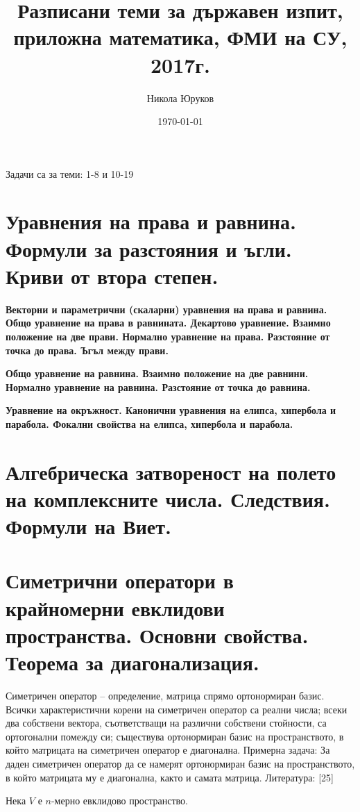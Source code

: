 \documentclass[11pt]{article}
\title{Разписани теми за държавен изпит, приложна математика, ФМИ на СУ, 2017г.}
\author{Никола Юруков}
\date{\today}
\numberwithin{equation}{section}
\numberwithin{figure}{section}
\numberwithin{table}{section}
\theoremstyle{plain}
\theoremstyle{definition}
\theoremstyle{remark}
\theoremstyle{definition}
\theoremstyle{remark}
\theoremstyle{plain}
\theoremstyle{definition}
\theoremstyle{definition}
\theoremstyle{plain}
\theoremstyle{plain}
\theoremstyle{plain}
\theoremstyle{definition}
\theoremstyle{plain}
\begin{document}
\maketitle

\clearpage

\tableofcontents

\clearpage

Задачи са за теми: 1-8 и 10-19

\section{Уравнения на права и равнина. Формули за разстояния и ъгли. Криви от втора степен.}

\textbf{Векторни и параметрични (скаларни) уравнения на права и равнина. Общо уравнение на права в равнината. Декартово уравнение. Взаимно положение на две прави. Нормално уравнение на права. Разстояние от точка до права. Ъгъл между прави.}

\textbf{Общо уравнение на равнина. Взаимно положение на две равнини. Нормално уравнение на равнина. Разстояние от точка до равнина.}

\textbf{Уравнение на окръжност. Канонични уравнения на елипса, хипербола и парабола. Фокални свойства на елипса, хипербола и парабола.}

\section{Алгебрическа затвореност на полето на комплексните числа. Следствия. Формули на Виет.}

\section{Симетрични оператори в крайномерни евклидови пространства. Основни свойства. Теорема за
диагонализация.}

Симетричен оператор – определение, матрица спрямо ортонормиран базис. Всички характеристични
корени на симетричен оператор са реални числа; всеки два собствени вектора, съответстващи на различни
собствени стойности, са ортогонални помежду си; съществува ортонормиран базис на пространството, в който
матрицата на симетричен оператор е диагонална.
Примерна задача: За даден симетричен оператор да се намерят ортонормиран базис на пространството,
в който матрицата му е диагонална, както и самата матрица.
Литература: [25]

Нека $V$ е $n$-мерно евклидово пространство.
\end{document}
